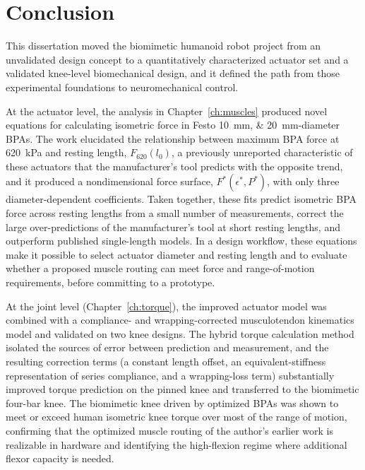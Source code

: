 \chapter{Conclusion}\label{ch:conclusion}
\graphicspath{{../Figures/80-conclusion/}{figs/80-conclusion/}}

This dissertation moved the biomimetic humanoid robot project from an unvalidated design concept to a quantitatively characterized actuator set and a validated knee-level biomechanical design, and it defined the path from those experimental foundations to neuromechanical control.

At the actuator level, the analysis in Chapter~\ref{ch:muscles} produced novel equations for calculating isometric force in Festo \qtylist{10;20}{\mm}-diameter BPAs. The work elucidated the relationship between maximum BPA force at \qty{620}{\kPa} and resting length, $F_{620}(l_0)$, a previously unreported characteristic of these actuators that the manufacturer's tool predicts with the opposite trend, and it produced a nondimensional force surface, $F^*(\epsilon^*,P^*)$, with only three diameter-dependent coefficients. Taken together, these fits predict isometric BPA force across resting lengths from a small number of measurements, correct the large over-predictions of the manufacturer's tool at short resting lengths, and outperform published single-length models. In a design workflow, these equations make it possible to select actuator diameter and resting length and to evaluate whether a proposed muscle routing can meet force and range-of-motion requirements, before committing to a prototype.

At the joint level (Chapter~\ref{ch:torque}), the improved actuator model was combined with a compliance- and wrapping-corrected musculotendon kinematics model and validated on two knee designs. The hybrid torque calculation method isolated the sources of error between prediction and measurement, and the resulting correction terms (a constant length offset, an equivalent-stiffness representation of series compliance, and a wrapping-loss term) substantially improved torque prediction on the pinned knee and transferred to the biomimetic four-bar knee. The biomimetic knee driven by optimized BPAs was shown to meet or exceed human isometric knee torque over most of the range of motion, confirming that the optimized muscle routing of the author's earlier work is realizable in hardware and identifying the high-flexion regime where additional flexor capacity is needed.

